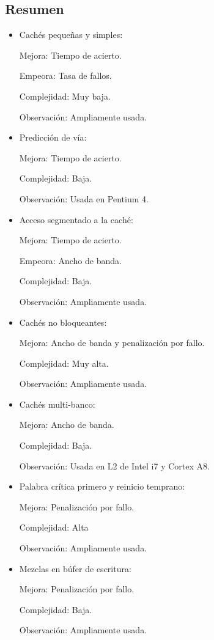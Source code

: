 \documentclass[12pt, twoside, openright]{report} %
\begin{document}
  \subsection{Resumen}
  \begin{itemize}
    \item Cachés pequeñas y simples:

Mejora: Tiempo de acierto.

Empeora: Tasa de fallos.

Complejidad: Muy baja.

Observación: Ampliamente usada.

    \item Predicción de vía:

Mejora: Tiempo de acierto.

Complejidad: Baja.

Observación: Usada en Pentium 4.

    \item Acceso segmentado a la caché:

Mejora: Tiempo de acierto.

Empeora: Ancho de banda.

Complejidad: Baja.

Observación: Ampliamente usada.

    \item Cachés no bloqueantes:

Mejora: Ancho de banda y penalización por fallo.

Complejidad: Muy alta.

Observación: Ampliamente usada.

    \item Cachés multi-banco:

Mejora: Ancho de banda.

Complejidad: Baja.

Observación: Usada en L2 de Intel i7 y Cortex A8.

    \item Palabra crítica primero y reinicio temprano:

Mejora: Penalización por fallo.

Complejidad: Alta

Observación: Ampliamente usada.

    \item Mezclas en búfer de escritura:

Mejora: Penalización por fallo.

Complejidad: Baja.

Observación: Ampliamente usada.


\end{itemize}
\end{document}
